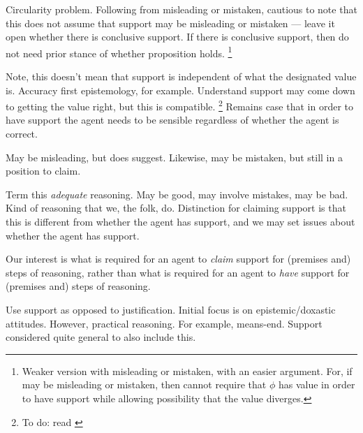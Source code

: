 \begin{note}[Support]
  Circularity problem.
  Following from misleading or mistaken, cautious to note that this does not assume that support may be misleading or mistaken --- leave it open whether there is conclusive support.
  If there is conclusive support, then do not need prior stance of whether proposition holds.\nolinebreak
  \footnote{
    Weaker version with misleading or mistaken, with an easier argument.
    For, if may be misleading or mistaken, then cannot require that \(\phi\) has value in order to have support while allowing possibility that the value diverges.
  }


  Note, this doesn't mean that support is independent of what the designated value is.
  Accuracy first epistemology, for example.
  Understand support may come down to getting the value right, but this is compatible.\nolinebreak
  \footnote{
    \color{red}
    To do: read \cite{Pettigrew:2019td}
  }
  Remains case that in order to have support the agent needs to be sensible regardless of whether the agent is correct.

  May be misleading, but does suggest.
  Likewise, may be mistaken, but still in a position to claim.
\end{note}

\begin{note}
  Term this \emph{adequate} reasoning.
  May be good, may involve mistakes, may be bad.
  Kind of reasoning that we, the folk, do.
  Distinction for claiming support is that this is different from whether the agent has support, and we may set issues about whether the agent has support.

  Our interest is what is required for an agent to \emph{claim} support for (premises and) steps of reasoning, rather than what is required for an agent to \emph{have} support for (premises and) steps of reasoning.

  Use support as opposed to justification.
  Initial focus is on epistemic/doxastic attitudes.
  However, practical reasoning.
  For example, means-end.
  Support considered quite general to also include this.
\end{note}

